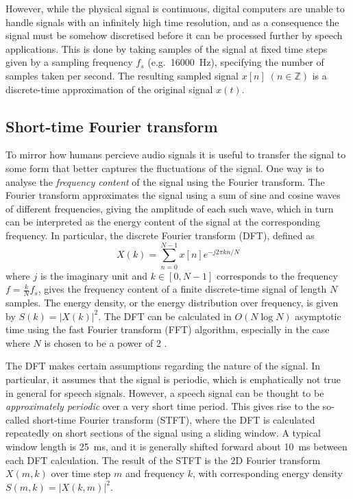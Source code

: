 However, while the physical signal is continuous, digital computers are unable to handle signals with an infinitely high time resolution, and as a consequence the signal must be somehow discretised before it can be processed further by speech applications.
This is done by taking samples of the signal at fixed time steps given by a sampling frequency $f_s$ (e.g.\ \SI{16000}{\Hz}), specifying the number of samples taken per second.
The resulting sampled signal $x[n]\; (n \in \mathbb{Z})$ is a discrete-time approximation of the original signal $x(t)$.

\subsection{Short-time Fourier transform}


To mirror how humans percieve audio signals it is useful to transfer the signal to some form that better captures the fluctuations of the signal.
One way is to analyse the \emph{frequency content} of the signal using the Fourier transform.
The Fourier transform approximates the signal using a sum of sine and cosine waves of different frequencies, giving the amplitude of each such wave, which in turn can be interpreted as the energy content of the signal at the corresponding frequency.
In particular, the discrete Fourier transform (DFT), defined as
\[
X(k) = \sum_{n=0}^{N-1} x[n]e^{-j2\pi kn/N}
\]
where $j$ is the imaginary unit and $k \in [0, N-1]$ corresponds to the frequency $f = \frac{k}{N}f_s$, gives the frequency content of a finite discrete-time signal of length $N$ samples.
The energy density, or the energy distribution over frequency, is given by $S(k) = \left|X(k)\right|^2$.
The DFT can be calculated in $O(N \log N)$ asymptotic time using the fast Fourier transform (FFT) algorithm, especially in the case where $N$ is chosen to be a power of 2 \parencite{cooley1965algorithm}.


The DFT makes certain assumptions regarding the nature of the signal.
In particular, it assumes that the signal is periodic, which is emphatically not true in general for speech signals.
However, a speech signal can be thought to be \emph{approximately periodic} over a very short time period.
This gives rise to the so-called short-time Fourier transform (STFT), where the DFT is calculated repeatedly on short sections of the signal using a sliding window.
A typical window length is \SI{25}{\ms}, and it is generally shifted forward about \SI{10}{\ms} between each DFT calculation.
The result of the STFT is the 2D Fourier transform $X(m,k)$ over time step $m$ and frequency $k$, with corresponding energy density $S(m,k) = \left|X(k,m)\right|^2$.

